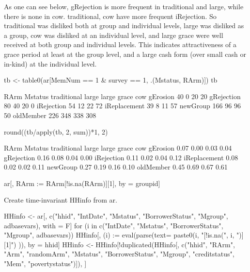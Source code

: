 As one can see below, \textsf{gRejection} is more frequent in \textsf{traditional} and \textsf{large}, while there is none in \textsf{cow}. \textsf{traditional, cow} have more frequent \textsf{iRejection}. So \textsf{traditional} was disliked both at group and individual levels, \textsf{large} was disliked as a group, \textsf{cow} was disliked at an individual level, and \textsf{large grace} were well received at both group and individual levels. This indicates attractiveness of a grace period at least at the group level, and a large cash form (over small cash or in-kind) at the individual level.
\begin{Schunk}
\begin{Sinput}
tb <- table0(ar[MemNum == 1 & survey == 1, .(Mstatus, RArm)])
tb
\end{Sinput}
\begin{Soutput}
              RArm
Mstatus        traditional large large grace cow
  gErosion              40     0          20  20
  gRejection            80    40          20   0
  iRejection            54    12          22  72
  iReplacement          39     8          11  57
  newGroup             166    96          96  50
  oldMember            226   348         338 308
\end{Soutput}
\end{Schunk}
\begin{Schunk}
\begin{Sinput}
round((tb/apply(tb, 2, sum))*1, 2)
\end{Sinput}
\begin{Soutput}
              RArm
Mstatus        traditional large large grace  cow
  gErosion            0.07  0.00        0.03 0.04
  gRejection          0.16  0.08        0.04 0.00
  iRejection          0.11  0.02        0.04 0.12
  iReplacement        0.08  0.02        0.02 0.11
  newGroup            0.27  0.19        0.16 0.10
  oldMember           0.45  0.69        0.67 0.61
\end{Soutput}
\end{Schunk}
\begin{Schunk}
\begin{Sinput}
ar[, RArm := RArm[!is.na(RArm)][1], by = groupid]
\end{Sinput}
\end{Schunk}
Create time-invariant \textsf{HHinfo} from \textsf{ar}. \gobblepars
\begin{Schunk}
\begin{Sinput}
HHinfo <- ar[, c("hhid", "IntDate", "Mstatus", "BorrowerStatus", "Mgroup",
  adbasevars), with = F]
for (i in c("IntDate", "Mstatus", "BorrowerStatus", "Mgroup",
  adbasevars))
  HHinfo[, (i) := eval(parse(text=
      paste0(i, "[!is.na(", i, ")][1]")
    )), by = hhid]
HHinfo <- HHinfo[!duplicated(HHinfo[, c("hhid", 
  "RArm", "Arm", "randomArm", 
  "Mstatus", "BorrowerStatus", "Mgroup", "creditstatus", "Mem", "povertystatus")]), ]
\end{Sinput}
\end{Schunk}
